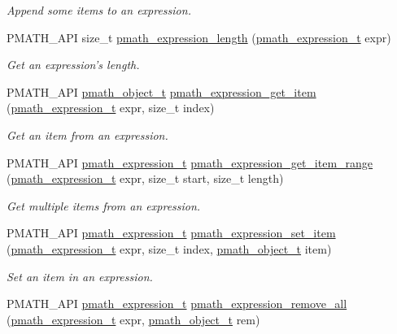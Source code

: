 \begin{CompactItemize}
\begin{CompactList}\small\item\em Append some items to an expression. \item\end{CompactList}\item 
PMATH\_\-API size\_\-t \hyperlink{group__expressions_g78702d12559a839077fa2dec0069ca9d}{pmath\_\-expression\_\-length} (\hyperlink{classpmath__expression__t}{pmath\_\-expression\_\-t} expr)
\begin{CompactList}\small\item\em Get an expression's length. \item\end{CompactList}\item 
PMATH\_\-API \hyperlink{classpmath__object__t}{pmath\_\-object\_\-t} \hyperlink{group__expressions_g0688f73dc8749112b41b226b3feb8997}{pmath\_\-expression\_\-get\_\-item} (\hyperlink{classpmath__expression__t}{pmath\_\-expression\_\-t} expr, size\_\-t index)
\begin{CompactList}\small\item\em Get an item from an expression. \item\end{CompactList}\item 
PMATH\_\-API \hyperlink{classpmath__expression__t}{pmath\_\-expression\_\-t} \hyperlink{group__expressions_gaa1a1070757eae4fa5b9a96f54948755}{pmath\_\-expression\_\-get\_\-item\_\-range} (\hyperlink{classpmath__expression__t}{pmath\_\-expression\_\-t} expr, size\_\-t start, size\_\-t length)
\begin{CompactList}\small\item\em Get multiple items from an expression. \item\end{CompactList}\item 
PMATH\_\-API \hyperlink{classpmath__expression__t}{pmath\_\-expression\_\-t} \hyperlink{group__expressions_gc4b56f0dc4437bdbb4b3d721f1396fc5}{pmath\_\-expression\_\-set\_\-item} (\hyperlink{classpmath__expression__t}{pmath\_\-expression\_\-t} expr, size\_\-t index, \hyperlink{classpmath__object__t}{pmath\_\-object\_\-t} item)
\begin{CompactList}\small\item\em Set an item in an expression. \item\end{CompactList}\item 
PMATH\_\-API \hyperlink{classpmath__expression__t}{pmath\_\-expression\_\-t} \hyperlink{group__expressions_gf23c4a25e9ec0e5018b23d2fb6dca4a2}{pmath\_\-expression\_\-remove\_\-all} (\hyperlink{classpmath__expression__t}{pmath\_\-expression\_\-t} expr, \hyperlink{classpmath__object__t}{pmath\_\-object\_\-t} rem)

\end{CompactItemize}
